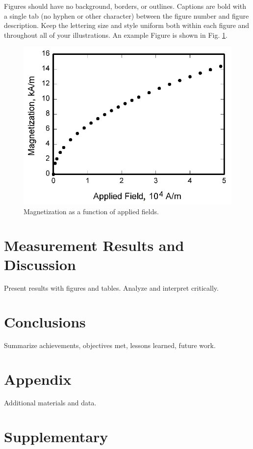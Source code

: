 \documentclass{engr1000j-s2} %
\begin{document}
  Figures should have no background, borders, or outlines. Captions are bold with a single tab (no hyphen or other character) between the figure number and figure description. Keep the lettering size and style uniform both within each figure and throughout all of your illustrations.  An example Figure is shown in Fig. \ref{fig:graph}.


  \begin{figure}[hbt!]  
  \centering
  \includegraphics[width=.5\textwidth]{figures/graph.jpg}
  \caption{\quad Magnetization as a function of applied fields.}
  \label{fig:graph}
  \end{figure}

  \hspace{1em}
  
  \section{Measurement Results and Discussion}
  Present results with figures and tables. Analyze and interpret critically.

  \hspace{1em}

  \section{Conclusions}
  Summarize achievements, objectives met, lessons learned, future work.

  \hspace{1em}


  \newpage
  \appendix
  \section{Appendix}
  Additional materials and data.

  \newpage
  \section{Supplementary}
\end{document}
